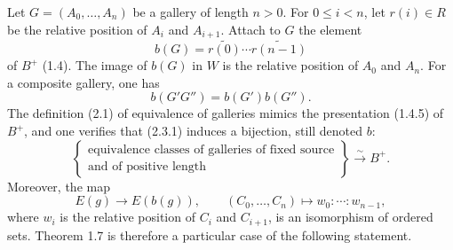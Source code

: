 \documentclass[11pt]{article}
\begin{document}
Let $G=(A_0,\ldots,A_n)$ be a gallery of length $n>0$. For $0\leq i<n$, let $r(i)\in R$ be the relative position of $A_i$ and $A_{i+1}$. Attach to $G$ the element
\begin{equation}
 b(G)=\widetilde{r(0)}\cdots \widetilde{r(n-1)}
\tag{2.3.1}
\end{equation}
of $B^+$ (1.4). The image of $b(G)$ in $W$ is the relative position of $A_0$ and $A_n$. For a composite gallery, one has
\begin{equation}
 b(G'G'')=b(G')b(G'').
\tag{2.3.2}
\end{equation}
The definition (2.1) of equivalence of galleries mimics the presentation (1.4.5) of $B^+$, and one verifies that (2.3.1) induces a bijection, still denoted $b$:
\begin{equation}
\left\{
\begin{array}{c}
\text{equivalence classes of galleries of fixed source}\\
\text{and of positive length}
\end{array}
\right\}\xrightarrow{\sim}B^+.
\tag{2.3.3}
\end{equation}
Moreover, the map
\[
 E(g)\longrightarrow E(b(g)),\qquad (C_0,\ldots,C_n)\longmapsto w_0:\cdots:w_{n-1},
\]
where $w_i$ is the relative position of $C_i$ and $C_{i+1}$, is an isomorphism of ordered sets. Theorem 1.7 is therefore a particular case of the following statement.
\end{document}
